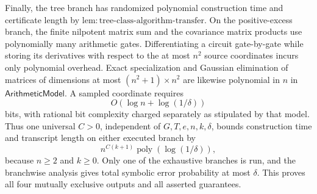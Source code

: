 Finally, the tree branch has randomized polynomial construction time and certificate length by \(\mathrm{lem:tree\mbox{-}class\mbox{-}algorithm\mbox{-}transfer}\).  On the positive-excess branch, the finite nilpotent matrix sum and the covariance matrix products use polynomially many arithmetic gates.  Differentiating a circuit gate-by-gate while storing its derivatives with respect to the at most \(n^2\) source coordinates incurs only polynomial overhead.  Exact specialization and Gaussian elimination of matrices of dimensions at most \((n^2+1)\times n^2\) are likewise polynomial in \(n\) in \(\mathsf{ArithmeticModel}\).  A sampled coordinate requires
\[
O(\log n+\log(1/\delta))
\]
bits, with rational bit complexity charged separately as stipulated by that model.  Thus one universal \(C>0\), independent of \(G,T,e,n,k,\delta\), bounds construction time and transcript length on either executed branch by
\[
n^{C(k+1)}\operatorname{poly}(\log(1/\delta)),
\]
because \(n\geq2\) and \(k\geq0\).  Only one of the exhaustive branches is run, and the branchwise analysis gives total symbolic error probability at most \(\delta\).  This proves all four mutually exclusive outputs and all asserted guarantees.
